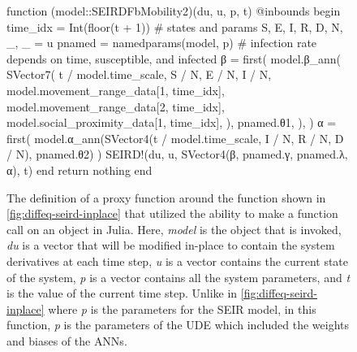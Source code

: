\begin{figure}[!htb]
\centering
\begin{jllisting}
function (model::SEIRDFbMobility2)(du, u, p, t)
    @inbounds begin
        time_idx = Int(floor(t + 1))
        # states and params
        S, E, I, R, D, N, _, _ = u
        pnamed = namedparams(model, p)
        # infection rate depends on time, susceptible, and infected
        β = first(
            model.β_ann(
                SVector{7}(
                    t / model.time_scale,
                    S / N,
                    E / N,
                    I / N,
                    model.movement_range_data[1, time_idx],
                    model.movement_range_data[2, time_idx],
                    model.social_proximity_data[1, time_idx],
                ),
                pnamed.θ1,
            ),
        )
        α = first(
            model.α_ann(SVector{4}(t / model.time_scale,
                                   I / N,
                                   R / N,
                                   D / N),
                        pnamed.θ2)
        )
        SEIRD!(du, u, SVector{4}(β, pnamed.γ, pnamed.λ, α), t)
    end
    return nothing
end
\end{jllisting}
\caption{The definition of a proxy function around the function shown in \autoref{fig:diffeq-seird-inplace} that utilized the ability to make a function call on an object in Julia. Here, \textit{model} is the object that is invoked, \textit{du} is a vector that will be modified in-place to contain the system derivatives at each time step, \textit{u} is a vector contains the current state of the system, \textit{p} is a vector contains all the system parameters, and \textit{t} is the value of the current time step. Unlike in \autoref{fig:diffeq-seird-inplace} where \textit{p} is the parameters for the SEIR model, in this function, \textit{p} is the parameters of the \gls{UDE} which included the weights and biases of the \glspl{ANN}.}
\label{fig:diffeq-seird-fb2}
\end{figure}

